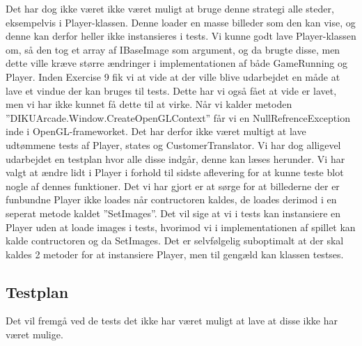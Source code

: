    Det har dog ikke været ikke været muligt at bruge denne strategi alle steder, eksempelvis i Player-klassen. Denne loader en masse billeder som den kan vise, og denne kan derfor heller ikke instansieres i tests. Vi kunne godt lave Player-klassen om, så den tog et array af IBaseImage som argument, og da brugte disse, men dette ville kræve større ændringer i implementationen af både GameRunning og Player. Inden Exercise 9 fik vi at vide at der ville blive udarbejdet en måde at lave et vindue der kan bruges til tests. Dette har vi også fået at vide er lavet, men vi har ikke kunnet få dette til at virke. Når vi kalder metoden ''DIKUArcade.Window.CreateOpenGLContext'' får vi en NullRefrenceException inde i OpenGL-frameworket. Det har derfor ikke været multigt at lave udtømmene tests af Player, states og CustomerTranslator. Vi har dog alligevel udarbejdet en testplan hvor alle disse indgår, denne kan læses herunder. Vi har valgt at ændre lidt i Player i forhold til sidste aflevering for at kunne teste blot nogle af dennes funktioner. Det vi har gjort er at sørge for at billederne der er funbundne Player ikke loades når contructoren kaldes, de loades derimod i en seperat metode kaldet ''SetImages''. Det vil sige at vi i tests kan instansiere en Player uden at loade images i tests, hvorimod vi i implementationen af spillet kan kalde contructoren og da SetImages. Det er selvfølgelig suboptimalt at der skal kaldes 2 metoder for at instansiere Player, men til gengæld kan klassen testses. 
\subsection{Testplan}
   Det vil fremgå ved de tests det ikke har været muligt at lave at disse ikke har været mulige.
